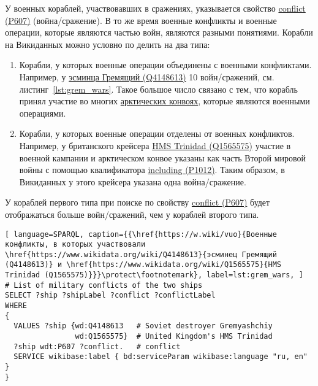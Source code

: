 У военных кораблей, участвовавших в сражениях, указывается свойство \href{https://www.wikidata.org/wiki/Property:P607}{conflict (P607)} (война/сражение). В то же время военные конфликты и военные операции, которые являются частью войн, являются разными понятиями. Корабли на Викиданных можно условно по делить на два типа:

\begin{enumerate}
  \item Корабли, у которых военные операции объединены с военными конфликтами. Например, у \href{https://www.wikidata.org/wiki/Q4148613}{эсминца Гремящий (Q4148613)} 10 войн/сражений, см. листинг~\ref{lst:grem_wars}. Такое большое число связано с тем, что корабль принял участие во многих \href{https://ru.wikipedia.org/wiki/Арктические_конвои}{арктических конвоях}, которые являются военными операциями.
  \item Корабли, у которых военные операции отделены от военных конфликтов. Например, у британского крейсера \href{https://www.wikidata.org/wiki/Q1565575}{HMS Trinidad (Q1565575)} участие в военной кампании и арктическом конвое указаны как часть Второй мировой войны с помощью квалификатора \href{https://www.wikidata.org/wiki/Property:P1012}{including (P1012)}. Таким образом, в Викиданных у этого крейсера указана одна война/сражение.
\end{enumerate}

У кораблей первого типа при поиске по свойству \href{https://www.wikidata.org/wiki/Property:P607}{conflict (P607)} будет отображаться больше войн/сражений, чем у кораблей второго типа. 

\label{question:ship_3}


\begin{lstlisting}[ language=SPARQL, caption={{\href{https://w.wiki/vuo}{Военные конфликты, в которых участвовали \href{https://www.wikidata.org/wiki/Q4148613}{эсминец Гремящий (Q4148613)} и \href{https://www.wikidata.org/wiki/Q1565575}{HMS Trinidad (Q1565575)}}}\protect\footnotemark}, label=lst:grem_wars, ]
# List of military conflicts of the two ships 
SELECT ?ship ?shipLabel ?conflict ?conflictLabel
WHERE
{
  VALUES ?ship {wd:Q4148613   # Soviet destroyer Gremyashchiy
                wd:Q1565575}  # United Kingdom's HMS Trinidad
  ?ship wdt:P607 ?conflict.   # conflict
  SERVICE wikibase:label { bd:serviceParam wikibase:language "ru, en" }
}
\end{lstlisting}

